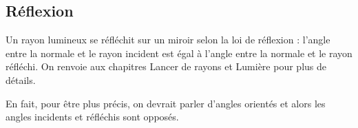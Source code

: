 \documentclass[11pt,class=report,crop=false]{standalone}
\begin{document}
\subsection{Réflexion}


Un rayon lumineux se réfléchit sur un miroir selon la loi de réflexion : l'angle entre la normale et le rayon incident est égal à l'angle entre la normale et le rayon réfléchi. On renvoie aux chapitres \og{}Lancer de rayons\fg{} et \og{}Lumière\fg{} pour plus de détails.


En fait, pour être plus précis, on devrait parler d'angles orientés et alors les angles incidents et réfléchis sont opposés.

\end{document}
